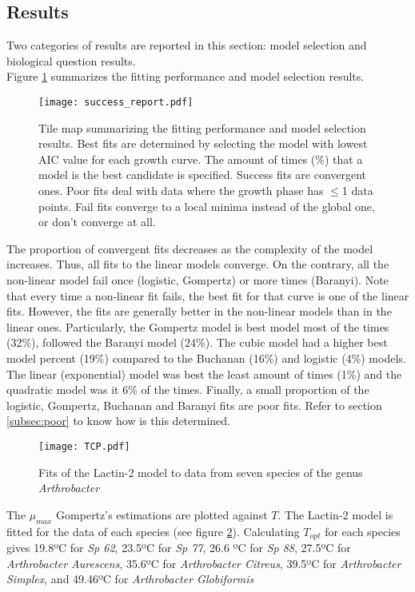 \documentclass[titlepage,11pt]{article}
\begin{document}
\begin{linenumbers}
	\section{Results}
	Two categories of results are reported in this section: model selection and biological question results. \\
	Figure \ref{fig:success_report} summarizes the fitting performance and model selection results.
	\begin{figure}[h!]
		\texttt{[image: success\_report.pdf]}
		\centering
		\caption{Tile map summarizing the fitting performance and model selection results. Best fits are determined by selecting the model with lowest AIC value for each growth curve. The amount of times (\%) that a model is the best candidate is specified. Success fits are convergent ones. Poor fits deal with data where the growth phase has $ \leq $1 data points. Fail fits converge to a local minima instead of the global one, or don't converge at all.}
		\label{fig:success_report}
	\end{figure}
	The proportion of convergent fits decreases as the complexity of the model increases. Thus, all fits to the linear models converge. On the contrary, all the non-linear model fail once (logistic, Gompertz) or more times (Baranyi). Note that every time a non-linear fit fails, the best fit for that curve is one of the linear fits. However, the fits are generally better in the non-linear models than in the linear ones. Particularly, the Gompertz model is best model most of the times (32\%), followed the Baranyi model (24\%). The cubic model had a higher best model percent (19\%) compared to the Buchanan (16\%) and logistic (4\%) models. The linear (exponential) model was best the least amount of times (1\%) and the quadratic model was it 6\% of the times. Finally, a small proportion of the logistic, Gompertz, Buchanan and Baranyi fits are poor fits. Refer to section \ref{subsec:poor} to know how is this determined.\\
	\begin{figure}[h]
		\texttt{[image: TCP.pdf]}
		\centering
		\caption{Fits of the Lactin-2 model to data from seven species of the genus \textit{Arthrobacter}}
		\label{fig:TCP}
	\end{figure}
	The $ \mu_{max} $  Gompertz's estimations are plotted against $ T $. The Lactin-2 model is fitted for the data of each species (see figure \ref{fig:TCP}). Calculating $ T_{opt} $ for each species gives 19.8ºC for \textit{Sp 62}, 23.5ºC for \textit{Sp 77}, 26.6 ºC for \textit{Sp 88}, 27.5ºC for \textit{Arthrobacter Aurescens}, 35.6ºC for \textit{Arthrobacter Citreus}, 39.5ºC for \textit{Arthrobacter Simplex}, and 49.46ºC for \textit{Arthrobacter Globiformis}

\end{linenumbers}
\end{document}
